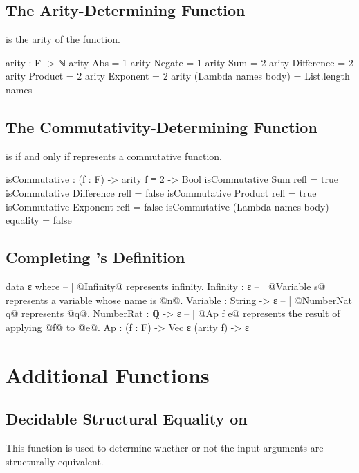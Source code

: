 \documentclass{report}
\begin{document}
\subsection{The Arity-Determining Function}
  is the arity of the  function.

\begin{code}
arity : F -> ℕ
arity Abs = 1
arity Negate = 1
arity Sum = 2
arity Difference = 2
arity Product = 2
arity Exponent = 2
arity (Lambda names body) = List.length names
\end{code}

\subsection{The Commutativity-Determining Function}
   is  if and only if  represents a commutative function.

\begin{code}
isCommutative : (f : F) -> arity f ≡ 2 -> Bool
isCommutative Sum refl = true
isCommutative Difference refl = false
isCommutative Product refl = true
isCommutative Exponent refl = false
isCommutative (Lambda names body) equality = false
\end{code}

\subsection{Completing 's Definition}

\begin{code}
data ε where
  -- | @Infinity@ represents infinity.
  Infinity : ε
  -- | @Variable s@ represents a variable whose name is @n@.
  Variable : String -> ε
  -- | @NumberNat q@ represents @q@.
  NumberRat : ℚ -> ε
  -- | @Ap f e@ represents the result of applying @f@ to @e@.
  Ap : (f : F) -> Vec ε (arity f) -> ε
\end{code}

\section{Additional Functions}

\subsection{Decidable Structural Equality on }
This function is used to determine whether or not the input arguments are structurally equivalent.
\end{document}
